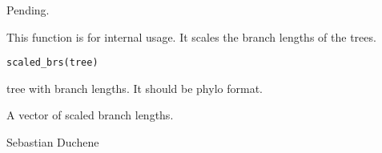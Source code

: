 \documentclass[a4paper]{book}
\begin{document}
%
\begin{References}\relax
Pending.
\end{References}
%
\begin{Description}\relax
This function is for internal usage. It scales the branch lengths of the trees.
\end{Description}
%
\begin{Usage}
\begin{verbatim}
scaled_brs(tree)
\end{verbatim}
\end{Usage}
%
\begin{Arguments}
\begin{ldescription}
\item[\code{tree}] 
tree with branch lengths. It should be phylo format.

\end{ldescription}
\end{Arguments}
%
\begin{Value}
A vector of scaled branch lengths.

Sebastian Duchene


\end{Value}
\printindex{}
\end{document}
